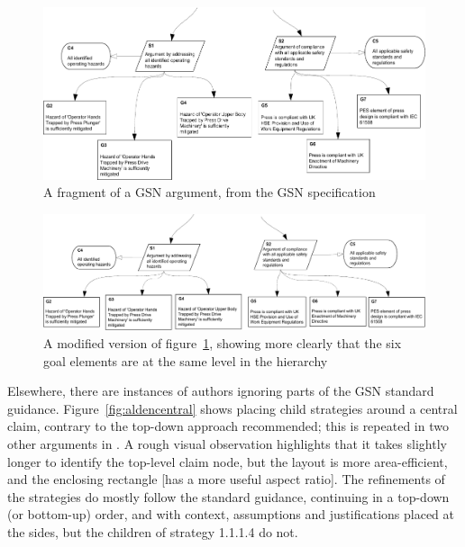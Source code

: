 \begin{figure}
    \includegraphics[width=\textwidth]{graphics/unaligned_siblings.pdf}
    \caption{A fragment of a GSN argument,
            from the GSN specification \citep[figure~42, section~2.3.6.5, pp.~34]{gsnstandard}}
    \label{fig:unalignedsiblings}
\end{figure}

\begin{figure}
    \includegraphics[width=\textwidth]{graphics/aligned_siblings.pdf}
    \caption{A modified version of figure~\ref{fig:unalignedsiblings},
            showing more clearly that the six goal elements are at the same level in the hierarchy}
    \label{fig:alignedsiblings}
\end{figure}

Elsewhere, there are instances of authors ignoring parts of the GSN standard guidance.
Figure~\ref{fig:aldencentral} shows \citet{royal} placing child strategies around a central claim, contrary to the top-down approach recommended; this is repeated in two other arguments in \cite[pp.~8--9]{royal} .
A rough visual observation highlights that it takes slightly longer to identify the top-level claim node, but the layout is more area-efficient, and the enclosing rectangle  [has a more useful aspect ratio].
The refinements of the strategies do mostly follow the standard guidance, continuing in a top-down (or bottom-up) order, and with context, assumptions and justifications placed at the sides, but the children of strategy 1.1.1.4 do not.


